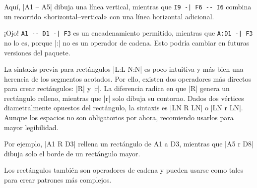 \begin{goban}[9, stone = {radius = 4pt}, mark = {line = {color = red}}]
\begin{codeexample}[width=6cm]
	\begin{goban}[label = {at = all}]
	\end{goban}
\end{codeexample}

Aquí, |A1 -- A5| dibuja una línea vertical, mientras que \verb+I9 -| F6 -- I6+ combina un recorrido «horizontal--vertical» con una línea horizontal adicional.

¡Ojo! \verb+A1 -- D1 -| F3+ es un encadenamiento permitido, mientras que \verb+A:D1 -| F3+ no lo es, porque |:| no es un operador de cadena. Esto podría cambiar en futuras versiones del paquete.


La sintaxis previa para rectángulos |L:L N:N| es poco intuitiva y más bien una herencia de los segmentos acotados. Por ello, existen dos operadores más directos para crear rectángulos: |R| y |r|. La diferencia radica en que |R| genera un rectángulo relleno, mientras que |r| solo dibuja su contorno. Dados dos vértices diametralmente opuestos del rectángulo, la sintaxis es |LN R LN| o |LN r LN|. Aunque los espacios no son obligatorios por ahora, recomiendo usarlos para mayor legibilidad.

\begin{codeexample}[width=6cm]
	\begin{goban}[label = {at = all}]
	\end{goban}
\end{codeexample}

Por ejemplo, |A1 R D3| rellena un rectángulo de A1 a D3, mientras que |A5 r D8| dibuja solo el borde de un rectángulo mayor.

Los rectángulos también son operadores de cadena y pueden usarse como tales para crear patrones más complejos.

\begin{codeexample}[width=6cm]
	\begin{goban}[label = {at = all}]
	\end{goban}
\end{codeexample}


\end{goban}
